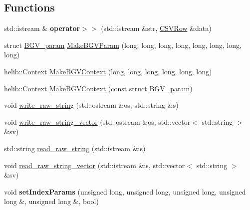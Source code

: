 \subsection*{Functions}
\begin{DoxyCompactItemize}
\item 
\mbox{\label{namespaceHDB__supergate___a6f4d992f1677f3406407ad6090818211}} 
std\+::istream \& {\bfseries operator$>$$>$} (std\+::istream \&str, \hyperlink{classHDB__supergate___1_1CSVRow}{C\+S\+V\+Row} \&data)
\item 
struct \hyperlink{structHDB__supergate___1_1BGV__param}{B\+G\+V\+\_\+param} \hyperlink{namespaceHDB__supergate___affa422b55e184c2fd69134364e309fbb}{Make\+B\+G\+V\+Param} (long, long, long, long, long, long, long, long)
\item 
helib\+::\+Context \hyperlink{namespaceHDB__supergate___a25f457f93b50fef2dcdb25e044d6cd7c}{Make\+B\+G\+V\+Context} (long, long, long, long, long, long)
\item 
helib\+::\+Context \hyperlink{namespaceHDB__supergate___a8a0616d8c5b340d3ff4b663fa841fc51}{Make\+B\+G\+V\+Context} (const struct \hyperlink{structHDB__supergate___1_1BGV__param}{B\+G\+V\+\_\+param})
\item 
void \hyperlink{namespaceHDB__supergate___a6ebfab3d5f8458069f6bed7956c54375}{write\+\_\+raw\+\_\+string} (std\+::ostream \&os, std\+::string \&s)
\item 
void \hyperlink{namespaceHDB__supergate___aaabeba84821bf0d2f399f7c69863924e}{write\+\_\+raw\+\_\+string\+\_\+vector} (std\+::ostream \&os, std\+::vector$<$ std\+::string $>$ \&sv)
\item 
std\+::string \hyperlink{namespaceHDB__supergate___a4dd1c2683249c24f76d7cf36a0606f5c}{read\+\_\+raw\+\_\+string} (std\+::istream \&is)
\item 
void \hyperlink{namespaceHDB__supergate___aec06d53ce9e30396768961aecd9a3a1a}{read\+\_\+raw\+\_\+string\+\_\+vector} (std\+::istream \&is, std\+::vector$<$ std\+::string $>$ \&sv)
\item 
\mbox{\label{namespaceHDB__supergate___a0891908122d714a0a40533f348800b64}} 
void {\bfseries set\+Index\+Params} (unsigned long, unsigned long, unsigned long, unsigned long \&, unsigned long \&, bool)
\item 
\mbox{\label{namespaceHDB__supergate___a02ca20243e923d4a0c34d8feb4fc4088}} 

\end{DoxyCompactItemize}
